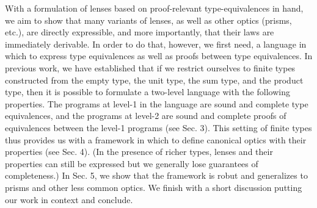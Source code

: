 \documentclass[sigplan,review,anonymous]{acmart}
\begin{document}
With a formulation of lenses based on proof-relevant type-equivalences
in hand, we aim to show that many variants of lenses, as well as other
optics (prisms, etc.), are directly expressible, and more importantly,
that their laws are immediately derivable. In order to do that,
however, we first need, a language in which to express type
equivalences as well as proofs between type equivalences. In previous
work, we have established that if we restrict ourselves to finite
types constructed from the empty type, the unit type, the sum type,
and the product type, then it is possible to formulate a two-level
language with the following properties. The programs at level-1 in the
language are sound and complete type equivalences, and the programs at
level-2 are sound and complete proofs of equivalences between the
level-1 programs (see Sec. 3). This setting of finite types thus
provides us with a framework in which to define canonical optics with
their properties (see Sec. 4). (In the presence of richer types,
lenses and their properties can still be expressed but we generally
lose guarantees of completeness.) In Sec. 5, we show that the
framework is robut and generalizes to prisms and other less common
optics. We finish with a short discussion putting our work in context
and conclude.


\end{document}
